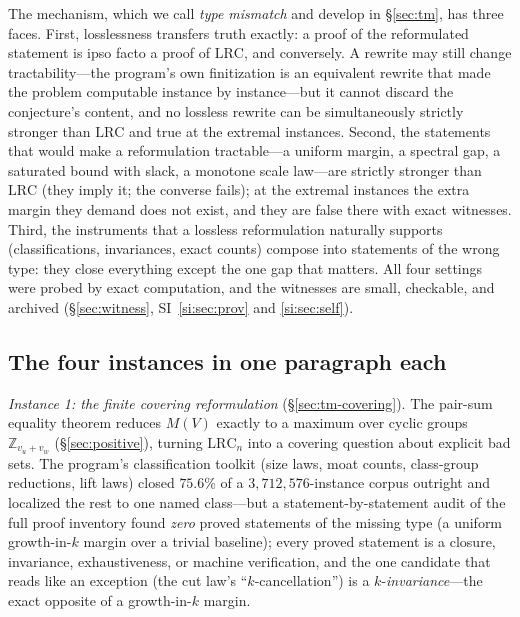 \documentclass[11pt,a4paper]{article}
\numberwithin{equation}{section}
\theoremstyle{plain}
\theoremstyle{definition}
\theoremstyle{remark}
\newcommand{\Z}{\mathbb{Z}}
\newcommand{\lrc}{\mathrm{LRC}}
\begin{document}
The mechanism, which we call \emph{type mismatch} and develop in
\S\ref{sec:tm}, has three faces. First, losslessness transfers truth
exactly: a proof of the reformulated statement is ipso facto a proof of
$\lrc$, and conversely. A rewrite may still change tractability---the
program's own finitization is an equivalent rewrite that made the problem
computable instance by instance---but it cannot discard the conjecture's
content, and no lossless rewrite can be simultaneously strictly stronger
than $\lrc$ and true at the extremal instances. Second, the statements
that would make a reformulation tractable---a uniform margin, a spectral
gap, a saturated bound with slack, a monotone scale law---are strictly
stronger than $\lrc$ (they imply it; the converse fails); at the extremal
instances the extra margin they demand does not exist, and they are false
there with exact witnesses. Third, the instruments that a lossless
reformulation naturally supports (classifications, invariances, exact
counts) compose into statements of the wrong type: they close everything
except the one gap that matters. All four settings were probed by exact
computation, and the witnesses are small, checkable, and archived
(\S\ref{sec:witness}, SI~\ref{si:sec:prov} and \ref{si:sec:self}).

\subsection{The four instances in one paragraph each}

\emph{Instance 1: the finite covering reformulation}
(\S\ref{sec:tm-covering}). The pair-sum equality theorem reduces
$M(V)$ exactly to a maximum over cyclic groups $\Z_{v_u+v_w}$
(\S\ref{sec:positive}), turning $\lrc_n$ into a covering question about
explicit bad sets. The program's classification toolkit (size laws, moat
counts, class-group reductions, lift laws) closed $75.6\%$ of a
$3{,}712{,}576$-instance corpus outright and localized the rest to one
named class---but a statement-by-statement audit of the full proof
inventory found \emph{zero} proved statements of the missing type (a
uniform growth-in-$k$ margin over a trivial baseline); every proved
statement is a closure, invariance, exhaustiveness, or machine
verification, and the one candidate that reads like an exception (the cut
law's ``$k$-cancellation'') is a $k$-\emph{invariance}---the exact
opposite of a growth-in-$k$ margin.
\end{document}
